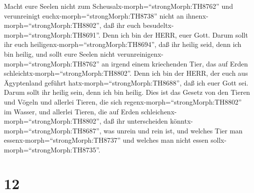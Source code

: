  Macht eure Seelen nicht zum
Scheusalx-morph=``strongMorph:TH8762'' und verunreinigt
euchx-morph=``strongMorph:TH8738'' nicht an
ihnenx-morph=``strongMorph:TH8802'', daß ihr euch
besudeltx-morph=``strongMorph:TH8691''.  Denn ich bin der
HERR, euer Gott. Darum sollt ihr euch
heiligenx-morph=``strongMorph:TH8694'', daß ihr heilig seid, denn ich
bin heilig, und sollt eure Seelen nicht
verunreinigenx-morph=``strongMorph:TH8762'' an irgend einem kriechenden
Tier, das auf Erden schleichtx-morph=``strongMorph:TH8802''.
 Denn ich bin der HERR, der euch aus Ägyptenland geführt
hatx-morph=``strongMorph:TH8688'', daß ich euer Gott sei. Darum sollt
ihr heilig sein, denn ich bin heilig.  Dies ist das Gesetz
von den Tieren und Vögeln und allerlei Tieren, die sich
regenx-morph=``strongMorph:TH8802'' im Wasser, und allerlei Tieren, die
auf Erden schleichenx-morph=``strongMorph:TH8802'',  daß
ihr unterscheiden könntx-morph=``strongMorph:TH8687'', was unrein und
rein ist, und welches Tier man essenx-morph=``strongMorph:TH8737'' und
welches man nicht essen sollx-morph=``strongMorph:TH8735''.

\hypertarget{section-11}{%
\section{12}\label{section-11}}

